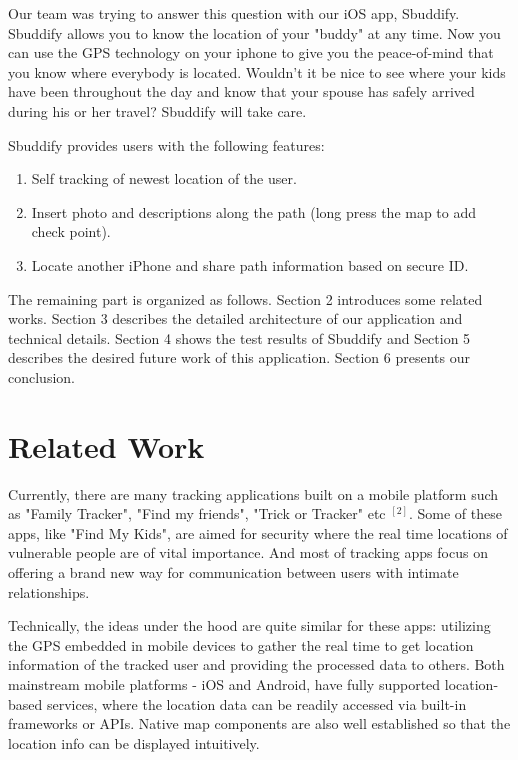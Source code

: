 \documentclass[journal]{IEEEtran}
\begin{document}
Our team was trying to answer this question with our iOS app, Sbuddify. Sbuddify allows you to know the location of your "buddy" at any time. Now you can use the GPS technology on your iphone to give you the peace-of-mind that you know where everybody is located. Wouldn't it be nice to see where your kids have been throughout the day and know that your spouse has safely arrived during his or her travel? Sbuddify will take care.

Sbuddify provides users with the following features:
\begin{enumerate}
\item
Self tracking of newest location of the user.

\item
Insert photo and descriptions along the path (long press the map to add check point).

\item
 Locate another iPhone and share path information based on secure ID.

\end{enumerate}

The remaining part is organized as follows. Section 2 introduces some related works. Section 3 describes the detailed architecture of our application and technical details. Section 4 shows the test results of Sbuddify and Section 5 describes the desired future work of this application. Section 6 presents our conclusion.

\section{Related Work}
Currently, there are many tracking applications built on a mobile platform such as "Family Tracker", "Find my friends", "Trick or Tracker" etc $^{[2]}$. Some of these apps, like "Find My Kids", are aimed for security where the real time locations of vulnerable people are of vital importance. And most of tracking apps focus on offering a brand new way for communication between users with intimate relationships.

Technically, the ideas under the hood are quite similar for these apps: utilizing the GPS embedded in mobile devices to gather the real time to get location information of the tracked user and providing the processed data to others. Both mainstream mobile platforms - iOS and Android, have fully supported location-based services, where the location data can be readily accessed via built-in frameworks or APIs. Native map components are also well established so that the location info can be displayed intuitively. 
\end{document}

